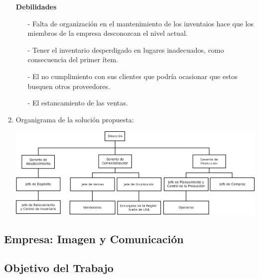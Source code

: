 \documentclass[a4paper,10pt,titlepage]{article}
\begin{document}
\begin{enumerate}
    \textbf{Debilidades}  
 
  \begin{enumerate}
      \item[-] Falta de organización en el mantenimiento de los inventaios hace que los miembros de la empresa desconozcan el nivel actual. 
      \item[-] Tener el inventario desperdigado en lugares inadecuados, como consecuencia del primer ítem.
      \item[-] El no cumplimiento con sus clientes que podría ocasionar que estos busquen otros proveedores.
      \item[-] El estancamiento de las ventas.
  
   \end{enumerate} 
   
   \newpage
   
\item Organigrama de la soluci\'on propuesta:
\begin{center}
      \includegraphics[angle=90, scale=0.60]{./Organigramas/Emporio2.png}
     \end{center}

\end{enumerate}

\newpage
\vspace*{\fill}
\begin{center}
\begingroup
\titlerule
\vspace{1cm}
\section{Empresa: Imagen y Comunicaci\'on}
\vspace{1cm}
\titlerule
\endgroup
\end{center}
\vspace*{\fill}

\newpage

\subsection{Objetivo del Trabajo}
\end{document}
